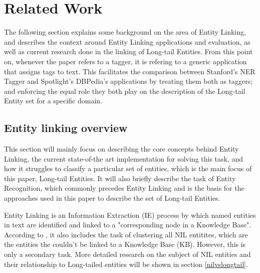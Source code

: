 

\section{Related Work} %
The following section explains some background on the area of Entity Linking,
and describes the context around Entity Linking applications and evaluation,
as well as current research done in the linking of Long-tail Entities.
From this point on, whenever the paper refers to a tagger, it is refering to a generic application that assigns tags to text.
This facilitates the comparison between Stanford's NER Tagger and Spotlight's DBPedia's applications by treating them both as taggers;
and enforcing the equal role they both play on the description of the Long-tail Entity set for a specific domain.

\subsection{Entity linking overview} %

This section will mainly focus on describing the core concepts behind Entity Linking, the current state-of-the art implementation for solving this task, and how it struggles to classify a particular set of entities, which is the main focus of this paper, Long-tail Entities.
It will also briefly describe the task of Entity Recognition, which commonly precedes Entity Linking and is the basis for the approaches used in this paper to describe the set of Long-tail Entities.

Entity Linking is an Information Extraction (IE) process by which named entities in text are identified and linked to a
"corresponding node in a Knowledge Base"\cite{rw_elo_HACHEY2013130}. 
According to \cite{silone}, it also includes the task of clustering all NIL entitites, which are the entities the couldn't be linked to a Knowledge Base (KB).
However, this is only a secondary task. More detailed research on the subject of NIL entities and their relationship to Long-tailed entities will be shown
in section \ref{nilvslongtail}.


